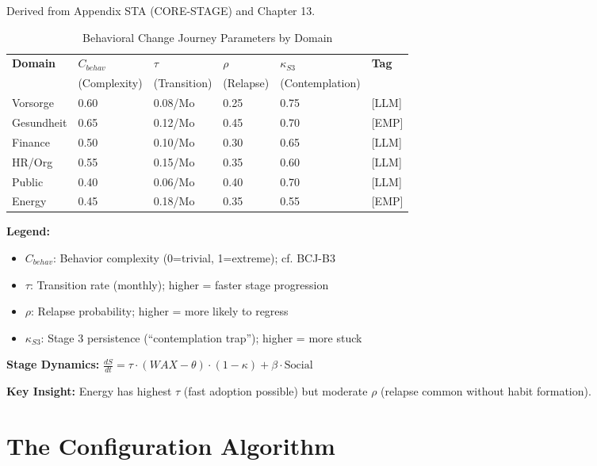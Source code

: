 Derived from Appendix STA (CORE-STAGE) and Chapter 13.

\begin{table}[htbp]
\centering
\caption{Behavioral Change Journey Parameters by Domain}
\label{tab:ggg-stage-mapping}
\renewcommand{\arraystretch}{1.3}
\begin{tabular}{@{}llllll@{}}
\toprule
\textbf{Domain} & \textbf{$C_{behav}$} & \textbf{$\tau$} & \textbf{$\rho$} & \textbf{$\kappa_{S3}$} & \textbf{Tag} \\
 & (Complexity) & (Transition) & (Relapse) & (Contemplation) & \\
\midrule
Vorsorge & 0.60 & 0.08/Mo & 0.25 & 0.75 & [LLM] \\
Gesundheit & 0.65 & 0.12/Mo & 0.45 & 0.70 & [EMP] \\
Finance & 0.50 & 0.10/Mo & 0.30 & 0.65 & [LLM] \\
HR/Org & 0.55 & 0.15/Mo & 0.35 & 0.60 & [LLM] \\
Public & 0.40 & 0.06/Mo & 0.40 & 0.70 & [LLM] \\
Energy & 0.45 & 0.18/Mo & 0.35 & 0.55 & [EMP] \\
\bottomrule
\end{tabular}
\end{table}

\textbf{Legend:}
\begin{itemize}[nosep]
\item $C_{behav}$: Behavior complexity (0=trivial, 1=extreme); cf. BCJ-B3
\item $\tau$: Transition rate (monthly); higher = faster stage progression
\item $\rho$: Relapse probability; higher = more likely to regress
\item $\kappa_{S3}$: Stage 3 persistence (``contemplation trap''); higher = more stuck
\end{itemize}

\textbf{Stage Dynamics:} $\frac{dS}{dt} = \tau \cdot (WAX - \theta) \cdot (1-\kappa) + \beta \cdot \text{Social}$

\textbf{Key Insight:} Energy has highest $\tau$ (fast adoption possible) but moderate $\rho$ (relapse common without habit formation).


\section{The Configuration Algorithm}
\label{sec:ggg-algorithm}

